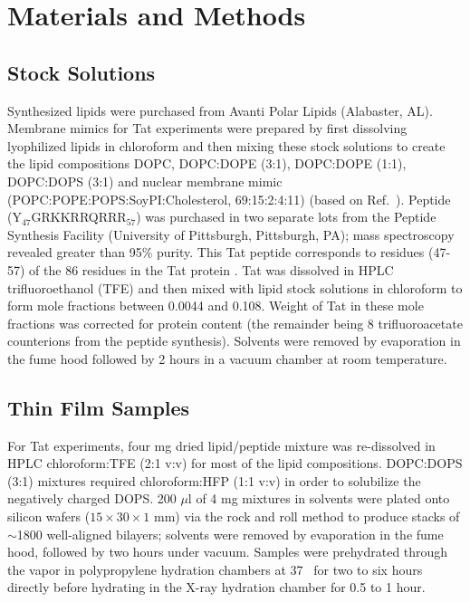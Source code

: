 \section{Materials and Methods}
\subsection{Stock Solutions}
Synthesized lipids were purchased from Avanti Polar Lipids (Alabaster, AL). 
Membrane mimics for Tat experiments were prepared by first 
dissolving lyophilized lipids in chloroform and then mixing these stock 
solutions to create the lipid compositions
DOPC, DOPC:DOPE (3:1), DOPC:DOPE (1:1), DOPC:DOPS (3:1) and nuclear membrane
mimic (POPC:POPE:POPS:SoyPI:Cholesterol, 69:15:2:4:11) (based on Ref.~\cite{Jarasch73}). 
Peptide (Y$_{47}$GRKKRRQRRR$_{57}$) was purchased in two separate lots from the 
Peptide Synthesis Facility (University of Pittsburgh, Pittsburgh, PA); 
mass spectroscopy revealed greater than 95\% purity. 
This Tat peptide corresponds to residues (47-57) of the 86 residues in the Tat 
protein \cite{Vives97}. 
Tat was dissolved in HPLC trifluoroethanol (TFE) and then mixed with lipid 
stock solutions in chloroform to form mole fractions between 0.0044 and 0.108. 
Weight of Tat in these mole fractions was corrected for protein content 
(the remainder being 8 trifluoroacetate counterions from the peptide synthesis). 
Solvents were removed by evaporation in the fume hood followed
by 2 hours in a vacuum chamber at room temperature.

\subsection{Thin Film Samples}
For Tat experiments, four mg dried lipid/peptide mixture was re-dissolved 
in HPLC chloroform:TFE (2:1 v:v) for most of the lipid compositions. 
DOPC:DOPS (3:1) mixtures required chloroform:HFP (1:1 v:v) in order to 
solubilize the negatively charged DOPS. 200 $\mu$l of 4 mg mixtures in 
solvents were plated onto silicon wafers ($15\times 30\times 1$ mm) via 
the rock and roll method \cite{Tristram-Nagle07_MMB} 
to produce stacks of $\sim$1800 well-aligned 
bilayers; solvents were removed by evaporation in the fume hood, followed by 
two hours under vacuum. Samples were prehydrated through the
vapor in polypropylene hydration chambers at 37 \textcelsius\ for two to six 
hours directly before hydrating in the X-ray hydration chamber 
\cite{Kucerka05_BPJ} for 0.5 to 1 hour. 

